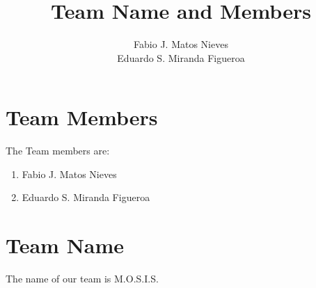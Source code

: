 \documentclass{article}
\author{Fabio J. Matos Nieves \\ Eduardo S. Miranda Figueroa}
\title{Team Name and Members}
\begin{document}
\maketitle
\section{Team Members}
The Team members are:
\begin{enumerate}
    \item Fabio J. Matos Nieves
    \item Eduardo S. Miranda Figueroa
\end{enumerate}
\section{Team Name}
The name of our team is M.O.S.I.S.
\end{document}
